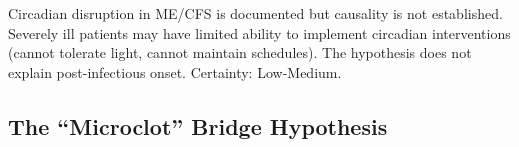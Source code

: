 \begin{warning}
Circadian disruption in ME/CFS is documented but causality is not established. Severely ill patients may have limited ability to implement circadian interventions (cannot tolerate light, cannot maintain schedules). The hypothesis does not explain post-infectious onset. Certainty: Low-Medium.
\end{warning}

\subsection{The ``Microclot'' Bridge Hypothesis}
\label{sec:microclot-bridge}

